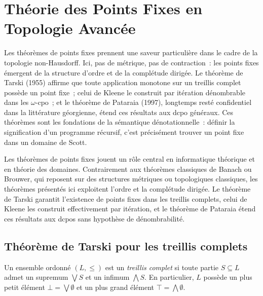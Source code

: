 \chapter{Th\'eorie des Points Fixes en Topologie Avanc\'ee}
\label{ch:points_fixes}

Les th\'eor\`emes de points fixes prennent une saveur particuli\`ere dans le cadre de la topologie non-Hausdorff. Ici, pas de m\'etrique, pas de contraction~: les points fixes \'emergent de la structure d'ordre et de la compl\'etude dirig\'ee. Le th\'eor\`eme de Tarski (1955) affirme que toute application monotone sur un treillis complet poss\`ede un point fixe~; celui de Kleene le construit par it\'eration d\'enombrable dans les $\omega$-cpo~; et le th\'eor\`eme de Pataraia (1997), longtemps rest\'e confidentiel dans la litt\'erature g\'eorgienne, \'etend ces r\'esultats aux dcpo g\'en\'eraux. Ces th\'eor\`emes sont les fondations de la s\'emantique d\'enotationnelle~: d\'efinir la signification d'un programme r\'ecursif, c'est pr\'ecis\'ement trouver un point fixe dans un domaine de Scott.

\begin{intuition}
Les th\'eor\`emes de points fixes jouent un r\^ole central en informatique th\'eorique et
en th\'eorie des domaines. Contrairement aux th\'eor\`emes classiques de Banach ou Brouwer,
qui reposent sur des structures m\'etriques ou topologiques classiques, les th\'eor\`emes
pr\'esent\'es ici exploitent l'ordre et la compl\'etude dirig\'ee. Le th\'eor\`eme de
Tarski garantit l'existence de points fixes dans les treillis complets, celui de Kleene
les construit effectivement par it\'eration, et le th\'eor\`eme de Pataraia \'etend ces
r\'esultats aux dcpos sans hypoth\`ese de d\'enombrabilit\'e.
\end{intuition}

\section{Th\'eor\`eme de Tarski pour les treillis complets}

\begin{definition}
Un ensemble ordonn\'e $(L, \leq)$ est un \emph{treillis complet} si toute partie
$S \subseteq L$ admet un supremum $\bigvee S$ et un infimum $\bigwedge S$. En
particulier, $L$ poss\`ede un plus petit \'el\'ement $\bot = \bigvee \emptyset$ et un
plus grand \'el\'ement $\top = \bigwedge \emptyset$.
\end{definition}

